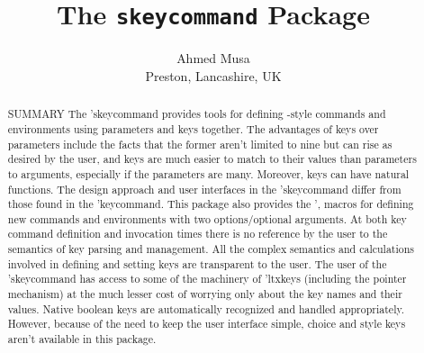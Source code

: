 \documentclass[
  use-a4-paper,
  use-10pt-font,
  final-version,
  use-UK-English,
  fancy-section-headings,
  frame-section-numbers,
  input-config-file,
  no-hyperref-messages,
  fancy-footers
]{amltxdoc}
\begin{document}
\begin{frontmatter}
\suptitle{}
\title{The \texttt{\color{blue}skeycommand} Package}
\subtitlefont{\normalsize\normalfont}
\subtitle{}
\author{Ahmed Musa\\Preston, Lancashire, UK}

\renewdef*\abstractname{\vspace{-\baselineskip}}
\begin{abstract}
\begin{frameshade}[width=\hsize,fillcolor=yellow!20,framesep=2pt,framerule=2pt,
  framecolor=brown]
  \frameshade[fillcolor=white,width=2.5cm,framecolor=red!60,framerule=2pt]
    \centering SUMMARY
  \endframeshade
  \small
  The \pkgm'{skeycommand} provides tools for defining \latex-style commands and environments using parameters and keys together. The advantages of keys over parameters include the facts that the former aren't limited to nine but can rise as desired by the user, and keys are much easier to match to their values than parameters to arguments, especially if the parameters are many. Moreover, keys can have natural functions. The design approach and user interfaces in the \pkgg'{skeycommand} differ from those found in the \pkgm'{keycommand}. This package also provides the \ffx'{\newtwooptcmd,\newtwooptenviron} macros for defining new commands and environments with two options/optional arguments. At both key command definition and invocation times there is no reference by the user to the semantics of key parsing and management. All the complex semantics and calculations involved in defining and setting keys are transparent to the user. The user of the \pkgg'{skeycommand} has access to some of the machinery of \pkg'{ltxkeys} (including the pointer mechanism) at the much lesser cost of worrying only about the key names and their values. Native boolean keys are automatically recognized and handled appropriately. However, because of the need to keep the user interface simple, choice and style keys aren't available in this package.
\end{frameshade}
\end{abstract}


\end{frontmatter}
\end{document}
